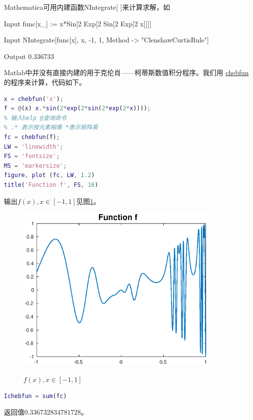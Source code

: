 Mathematica可用内建函数NIntegrate[ ]来计算求解，如
\begin{mmaCell}[functionlocal=y]{Input}
func[x_] := x*Sin[2  Exp[2  Sin[2 Exp[2  x]]]]
\end{mmaCell}
\begin{mmaCell}{Input}
NIntegrate[func[x], {x, -1, 1}, Method -> "ClenshawCurtisRule"]
\end{mmaCell}
\begin{mmaCell}{Output}
0.336733
\end{mmaCell}

Matlab中并没有直接内建的用于克伦肖——柯蒂斯数值积分程序。我们用
\href{https://github.com/chebfun/chebfun}{chebfun}的程序来计算，代码如下。


\begin{lstlisting}[language=Matlab]
% 假定要对方程f(x)在[-1,1]求积
x = chebfun('x');
f = @(x) x.*sin(2*exp(2*sin(2*exp(2*x))));
% 输入help @查询命令
% .* 表示按元素相乘 *表示矩阵乘
fc = chebfun(f);
LW = 'linewidth';
FS = 'fontsize';
MS = 'markersize';
figure, plot (fc, LW, 1.2)
title('Function f', FS, 16)
\end{lstlisting}
输出$f(x), x \in [-1,1]$见图\ref{fig:ninc-cc-code-f}。
\begin{figure}[htbp]
   \caption{$f(x), x \in [-1,1]$}
  \centering
  \includegraphics[width=10cm]{./Figures/20180308-function-f.eps}
  \label{fig:ninc-cc-code-f}
%
\end{figure}

\begin{lstlisting}[language=Matlab]
% 输出积分的数值近似值
Ichebfun = sum(fc)
\end{lstlisting}
返回值$0.336732834781728$。

